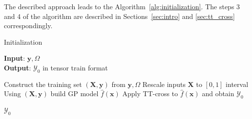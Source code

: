 The described approach leads to the Algorithm~\ref{alg:initialization}.
The steps 3 and 4 of the algorithm are described in
Sections~\ref{sec:intro} and \ref{sec:tt_cross} correspondingly.

\begin{algorithm}
\caption{Initialization}
\label{alg:initialization}
    \hspace*{\algorithmicindent} \textbf{Input}: $\mathbf{y}, \Omega$ \\
    \hspace*{\algorithmicindent} \textbf{Output}: $\mathcal{Y}_0$ in tensor train format
    \begin{algorithmic}[1]
        \State Construct the training set $(\mathbf{X}, \mathbf{y})$ from $\mathbf{y}, \Omega$
        \State Rescale inputs $\mathbf{X}$ to $[0, 1]$ interval
        \State Using $(\mathbf{X}, \mathbf{y})$ build GP model $\hat{f}(\mathbf{x})$
        \State Apply TT-cross to $\hat{f}(\mathbf{x})$ and obtain $\mathcal{Y}_0$

        \State \Return $\mathcal{Y}_0$
    \end{algorithmic}
\end{algorithm}


